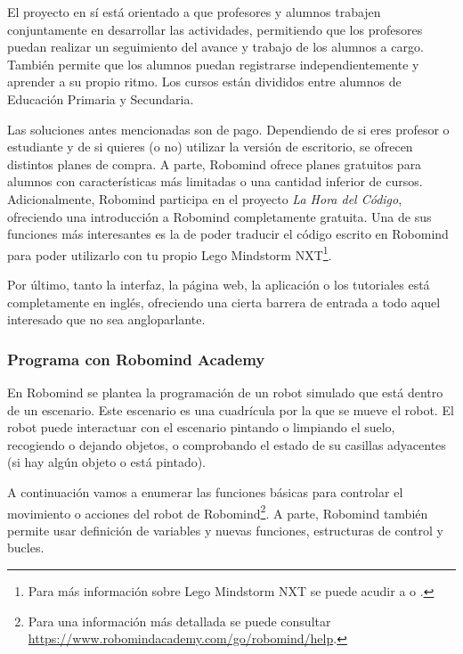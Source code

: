 El proyecto en sí está orientado a que profesores y alumnos trabajen conjuntamente en desarrollar las actividades, permitiendo que los profesores puedan realizar un seguimiento del avance y trabajo de los alumnos a cargo. También permite que los alumnos puedan registrarse independientemente y aprender a su propio ritmo. Los cursos están divididos entre alumnos de Educación Primaria y Secundaria. 

Las soluciones antes mencionadas son {\color{red}de pago}. Dependiendo de si eres profesor o estudiante y de si quieres (o no) utilizar la versión de escritorio, se ofrecen distintos planes de compra. 
A parte, Robomind ofrece planes gratuitos para alumnos con características más limitadas o una cantidad inferior de cursos. Adicionalmente, Robomind participa en el proyecto \emph{La Hora del Código}\cite{hour-of-code}, ofreciendo una introducción a Robomind completamente gratuita. Una de sus funciones más interesantes es la de poder traducir el código escrito en Robomind para poder utilizarlo con tu propio Lego Mindstorm NXT\footnote{Para más información sobre Lego Mindstorm NXT se puede acudir a \cite{lego-mindstorm} o \cite{lego-mindstorm-programar}.}.

Por último, tanto la interfaz, la página web, la aplicación o los tutoriales está completamente en inglés, ofreciendo una cierta barrera de entrada a todo aquel interesado que no sea angloparlante. 

\subsubsection{Programa con Robomind Academy}

En Robomind se plantea la programación de un robot simulado que está dentro de un escenario. Este escenario es una cuadrícula por la que se mueve el robot. El robot puede interactuar con el escenario pintando o limpiando el suelo, recogiendo o dejando objetos, o comprobando el estado de su casillas adyacentes (si hay algún objeto o está pintado).

A continuación vamos a enumerar las funciones básicas para controlar el movimiento o acciones del robot de Robomind\footnote{Para una información más detallada se puede consultar \url{https://www.robomindacademy.com/go/robomind/help}.}. {\color{blue}A parte, Robomind también permite usar definición de variables y nuevas funciones, estructuras de control y bucles.}

